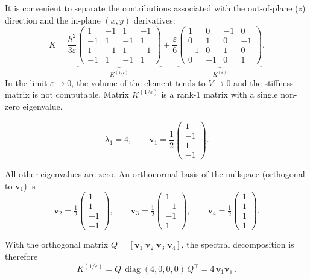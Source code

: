 \documentclass{article}
\begin{document}
It is convenient to separate the contributions associated with
the out-of-plane ($z$) direction and the in-plane $(x,y)$ derivatives:
\[
K = 
\frac{h^2}{3\varepsilon}
\underbrace{\begin{pmatrix}
1 & -1 & 1 & -1\\
-1& 1 & -1& 1 \\
1 & -1& 1 & -1\\
-1& 1 & -1& 1
\end{pmatrix}}_{K^{(1/\varepsilon)}}
+\frac{\varepsilon}{6}
\underbrace{
\begin{pmatrix}
1 & 0 & -1 & 0\\
0 & 1 & 0 & -1\\
-1& 0 & 1 & 0\\
0 & -1& 0 & 1
\end{pmatrix}}_{K^{(\varepsilon)}}.
\]
In the limit $\varepsilon \rightarrow 0$, the volume of the element tends to $V \rightarrow 0$ and the stiffness matrix is not computable.
Matrix \({K^{(1/\varepsilon)}}\) is a rank-1 matrix with a single non-zero eigenvalue.

\[
\lambda_1 = 4, \qquad
\bm{v}_1 = \frac{1}{2}
\begin{pmatrix}
1 \\ -1 \\ 1 \\ -1
\end{pmatrix}.
\]

All other eigenvalues are zero.  
An orthonormal basis of the nullspace (orthogonal to \(\bm{v}_1\)) is
\[
\bm{v}_2 = \tfrac{1}{2}
\begin{pmatrix}
1 \\ 1 \\ -1 \\ -1
\end{pmatrix},
\qquad
\bm{v}_3 = \tfrac{1}{2}
\begin{pmatrix}
1 \\ -1 \\ -1 \\ 1
\end{pmatrix},
\qquad
\bm{v}_4 = \tfrac{1}{2}
\begin{pmatrix}
1 \\ 1 \\ 1 \\ 1
\end{pmatrix}.
\]

With the orthogonal matrix \(Q = [\bm{v}_1\;\bm{v}_2\;\bm{v}_3\;\bm{v}_4]\),
the spectral decomposition is therefore
\[
{K^{(1/\varepsilon)}} = Q\,
\operatorname{diag}(4,0,0,0)\,
Q^\top
  = 4\,\bm{v}_1\bm{v}_1^\top.
\]
\end{document}
